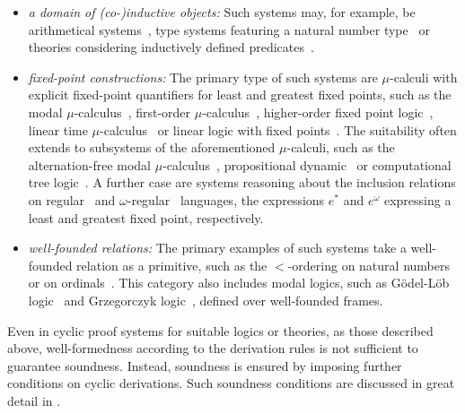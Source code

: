 \begin{itemize}
\item \emph{a domain of (co-)inductive objects:} Such systems may, for example,
  be arithmetical
  systems~\parencite{berardiEquivalenceIntuitionisticInductive2017}, type systems
  featuring a natural number type~\parencite{dasCircularVersionGodel2021} or
  theories considering inductively defined predicates~\parencite{brotherstonSequentCalculusProof2006}.
\item \emph{fixed-point constructions:} The primary type of such
  systems are $\mu$-calculi with explicit fixed-point quantifiers for least and
  greatest fixed points, such as the modal
  $\mu$-calculus~\parencite{niwinskiGamesMcalculus1996}, first-order
  $\mu$-calculus~\parencite{sprengerGlobalInductionMechanisms2003}, higher-order
  fixed point logic~\parencite{koriCyclicProofSystem2021}, linear time
  $\mu$-calculus~\parencite{daxProofSystemLinear2006} or linear logic with
  fixed points~\parencite{baeldeInfinitaryProofTheory2016}. The suitability often
  extends to subsystems of
  the aforementioned $\mu$-calculi, such as
  the alternation-free modal
  $\mu$-calculus~\parencite{martiFocusSystemAlternationFree2021}, propositional
  dynamic~\parencite{dochertyNonwellfoundedLabelledProof2019} or
  computational tree logic~\parencite{afshariCyclicProofSystem2023}.
  A further case are systems reasoning about the inclusion relations on
  regular~\parencite{dasCutFreeCyclicProof2017} and
  $\omega$-regular~\parencite{hazardCyclicProofsTransfinite2022} languages,
  the expressions $e^*$ and $e^\omega$ expressing a least and greatest
  fixed point, respectively.
\item \emph{well-founded relations:} The primary examples of
  such systems take a well-founded relation as a primitive,
  such as the $<$-ordering on natural
  numbers~\parencite{simpsonCyclicArithmeticEquivalent2017} or on
  ordinals~\parencite{sprengerGlobalInductionMechanisms2003}. This category also includes modal
  logics, such as Gödel-Löb
  logic~\parencite{shamkanovCircularProofsGodelLob2014} and Grzegorczyk
  logic~\parencite{savateevNonWellFoundedProofsGrzegorczyk2018}, defined over
  well-founded frames.
\end{itemize}

Even in cyclic proof systems for suitable logics or theories, as those described
above, well-formedness according to the derivation rules is not sufficient to
guarantee soundness. Instead, soundness is ensured by imposing further
conditions on cyclic derivations. Such soundness conditions are discussed in
great detail in .


